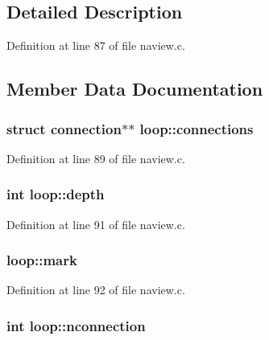 \subsection{Detailed Description}


Definition at line 87 of file naview.\+c.



\subsection{Member Data Documentation}
\hypertarget{structloop_a85ed661384f3377c0a3c097420330198}{
\subsubsection[{connections}]{\setlength{\rightskip}{0pt plus 5cm}struct {\bf connection}$\ast$$\ast$ loop\+::connections}}\label{structloop_a85ed661384f3377c0a3c097420330198}


Definition at line 89 of file naview.\+c.

\hypertarget{structloop_a3ebdd99aa3fb443f33a26ac8816a8112}{
\subsubsection[{depth}]{\setlength{\rightskip}{0pt plus 5cm}int loop\+::depth}}\label{structloop_a3ebdd99aa3fb443f33a26ac8816a8112}


Definition at line 91 of file naview.\+c.

\hypertarget{structloop_abc3be3dad4089b9b6a81781bf979fbbe}{
\subsubsection[{mark}]{ loop\+::mark}}\label{structloop_abc3be3dad4089b9b6a81781bf979fbbe}


Definition at line 92 of file naview.\+c.

\hypertarget{structloop_ac618052090293f928ddacbecc778a76c}{
\subsubsection[{nconnection}]{\setlength{\rightskip}{0pt plus 5cm}int loop\+::nconnection}}\label{structloop_ac618052090293f928ddacbecc778a76c}


